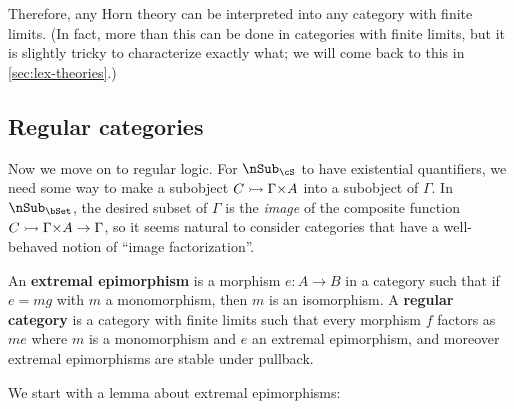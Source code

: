 Therefore, any Horn theory can be interpreted into any category with finite limits.
(In fact, more than this can be done in categories with finite limits, but it is slightly tricky to characterize exactly what; we will come back to this in \cref{sec:lex-theories}.)


\subsection{Regular categories}
\label{sec:regular-categories}

Now we move on to regular logic.
For $\sub_\cS$ to have existential quantifiers, we need some way to make a subobject $C\mono \Gamma\times A$ into a subobject of $\Gamma$.
In $\sub_\bSet$, the desired subset of $\Gamma$ is the \emph{image} of the composite function $C\mono \Gamma\times A \to\Gamma$, so it seems natural to consider categories that have a well-behaved notion of ``image factorization''.

\begin{defn}
  An \textbf{extremal epimorphism} is a morphism $e:A\to B$ in a category such that if $e = m g$ with $m$ a monomorphism, then $m$ is an isomorphism.
  A \textbf{regular category} is a category with finite limits such that every morphism $f$ factors as $m e$ where $m$ is a monomorphism and $e$ an extremal epimorphism, and moreover extremal epimorphisms are stable under pullback.
\end{defn}

We start with a lemma about extremal epimorphisms:

